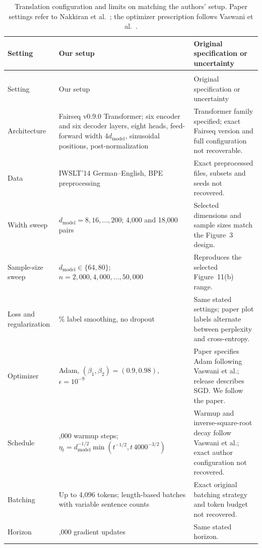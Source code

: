 \documentclass{article}
\begin{document}
\begin{longtable}{@{}>{\raggedright\arraybackslash}p{}>{\raggedright\arraybackslash}p{}>{\raggedright\arraybackslash}p{}@{}}
\caption{Translation configuration and limits on matching the authors' setup. Paper settings refer to Nakkiran et al.~\cite{nakkiran2021deepdouble}; the optimizer prescription follows Vaswani et al.~\cite{vaswani2017attention}.}\label{tab:translation-protocol}\\
\toprule
Setting & Our setup & Original specification or uncertainty\\
\midrule
\endfirsthead
\multicolumn{3}{l}{Table~\thetable\ (continued)}\\
\toprule
Setting & Our setup & Original specification or uncertainty\\
\midrule
\endhead
\bottomrule
\endlastfoot
Architecture & Fairseq v0.9.0 Transformer; six encoder and six decoder layers, eight heads, feed-forward width $4d_{\mathrm{model}}$, sinusoidal positions, post-normalization & Transformer family specified; exact Fairseq version and full configuration not recoverable.\\
Data & IWSLT'14 German--English, BPE preprocessing & Exact preprocessed files, subsets and seeds not recovered.\\
Width sweep & $d_{\mathrm{model}}=8,16,\ldots,200$; 4,000 and 18,000 pairs & Selected dimensions and sample sizes match the Figure~3 design.\\
Sample-size sweep & $d_{\mathrm{model}}\in\{64,80\}$; $n=2{,}000,4{,}000,\ldots,50{,}000$ & Reproduces the selected Figure~11(b) range.\\
Loss and regularization & 10\% label smoothing, no dropout & Same stated settings; paper plot labels alternate between perplexity and cross-entropy.\\
Optimizer & Adam, $(\beta_1,\beta_2)=(0.9,0.98)$, $\epsilon=10^{-9}$ & Paper specifies Adam following Vaswani et al.; release describes SGD. We follow the paper.\\
Schedule & 4,000 warmup steps; $\eta_t=d_{\mathrm{model}}^{-1/2}\min(t^{-1/2},t\,4000^{-3/2})$ & Warmup and inverse-square-root decay follow Vaswani et al.; exact author configuration not recovered.\\
Batching & Up to 4,096 tokens; length-based batches with variable sentence counts & Exact original batching strategy and token budget not recovered.\\
Horizon & 80,000 gradient updates & Same stated horizon.\\
\end{longtable}
\clearpage
\end{document}

